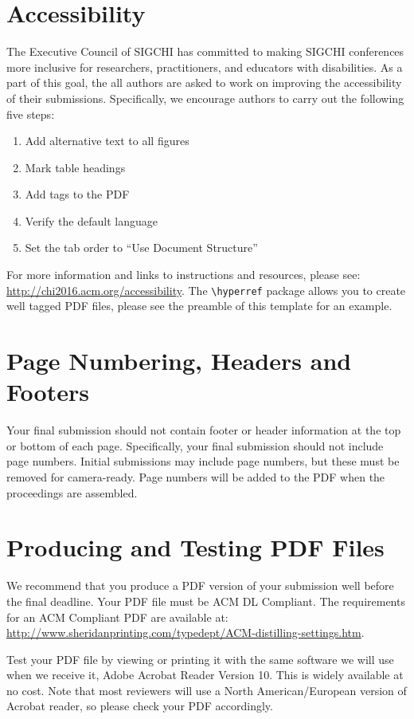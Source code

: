 \documentclass{sigchi}
\begin{document}
\section{Accessibility}
The Executive Council of SIGCHI has committed to making SIGCHI
conferences more inclusive for researchers, practitioners, and
educators with disabilities. As a part of this goal, the all authors
are asked to work on improving the accessibility of their
submissions. Specifically, we encourage authors to carry out the
following five steps:
\begin{enumerate}
\item Add alternative text to all figures
\item Mark table headings
\item Add tags to the PDF
\item Verify the default language
\item Set the tab order to ``Use Document Structure''
\end{enumerate}
For more information and links to instructions and resources, please
see: \url{http://chi2016.acm.org/accessibility}.  The
\texttt{{\textbackslash}hyperref} package allows you to create well tagged PDF files,
please see the preamble of this template for an example.

\section{Page Numbering, Headers and Footers}
Your final submission should not contain footer or header information
at the top or bottom of each page. Specifically, your final submission
should not include page numbers. Initial submissions may include page
numbers, but these must be removed for camera-ready. Page numbers will
be added to the PDF when the proceedings are assembled.

\section{Producing and Testing PDF Files}

We recommend that you produce a PDF version of your submission well
before the final deadline.  Your PDF file must be ACM DL
Compliant. The requirements for an ACM Compliant PDF are available at:
{\url{http://www.sheridanprinting.com/typedept/ACM-distilling-settings.htm}}.

Test your PDF file by viewing or printing it with the same software we
will use when we receive it, Adobe Acrobat Reader Version 10. This is
widely available at no cost. Note that most
reviewers will use a North American/European version of Acrobat
reader, so please check your PDF accordingly.
\end{document}
